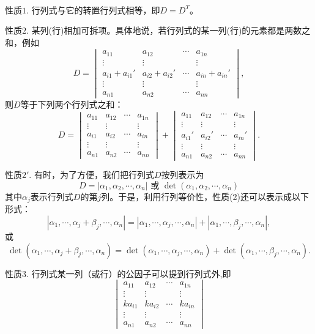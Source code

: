 \begin{prop}[行列式的性质]\
\enum
\item[性质$1$.] 行列式与它的转置行列式相等，即$D = D^T$。
\item[性质$2$.] 某列(行)相加可拆项。具体地说，若行列式的某一列(行)的元素都是两数之和，例如
$$D = \begin{vmatrix}
a_{11} & a_{12} & \cdots & a_{1n} \\ \vdots & \vdots & & \vdots \\ a_{i1}+a_{i1}' & a_{i2}+a_{i2}' & \cdots & a_{in}+a_{in}' \\ \vdots & \vdots & & \vdots \\ a_{n1} & a_{n2} & \cdots & a_{nn}
\end{vmatrix},$$
则$D$等于下列两个行列式之和：
$$D = \begin{vmatrix}
a_{11} & a_{12} & \cdots & a_{1n} \\ \vdots & \vdots & & \vdots \\ a_{i1} & a_{i2} & \cdots & a_{in} \\ \vdots & \vdots & & \vdots \\ a_{n1} & a_{n2} & \cdots & a_{nn}
\end{vmatrix} + \begin{vmatrix}
a_{11} & a_{12} & \cdots & a_{1n} \\ \vdots & \vdots & & \vdots \\ a_{i1}' & a_{i2}' & \cdots & a_{in}' \\ \vdots & \vdots & & \vdots \\ a_{n1} & a_{n2} & \cdots & a_{nn}
\end{vmatrix}.$$
\item[性质$2'$.] 有时，为了方便，我们把行列式$D$按列表示为
$$D = \left|\alpha_1, \alpha_2, \cdots, \alpha_n \right| \text{ 或 } \det(\alpha_1, \alpha_2, \cdots, \alpha_n)$$
其中$\alpha_j$表示行列式$D$的第$j$列。于是，利用行列等价性，性质(2)还可以表示成以下形式：
$$\left|\alpha_1, \cdots, \alpha_j + \beta_j, \cdots, \alpha_n \right| = \left|\alpha_1, \cdots, \alpha_j, \cdots, \alpha_n \right| + \left|\alpha_1, \cdots, \beta_j, \cdots, \alpha_n \right|,$$
或
$$\det(\alpha_1, \cdots, \alpha_j + \beta_j, \cdots, \alpha_n) = \det(\alpha_1, \cdots, \alpha_j, \cdots, \alpha_n) + \det(\alpha_1, \cdots, \beta_j, \cdots, \alpha_n).$$
\item[性质$3$.] 行列式某一列（或行）的公因子可以提到行列式外,即
$$\begin{vmatrix}
a_{11} & a_{12} & \cdots & a_{1n} \\ \vdots & \vdots & & \vdots \\ ka_{i1} & ka_{i2} & \cdots & ka_{in} \\ \vdots & \vdots & & \vdots \\ a_{n1} & a_{n2} & \cdots & a_{nn}

\end{vmatrix}$$
\end{prop}
